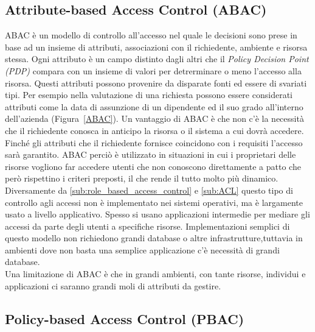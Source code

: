 \subsection{Attribute-based Access Control (ABAC)} %
\label{sub:attribute_based_access_control_}

ABAC è un modello di controllo all'accesso  nel quale le decisioni sono prese in base ad un insieme 
di attributi, associazioni con il richiedente, ambiente e risorsa stessa.
Ogni attributo è un campo distinto dagli altri che il \textit{Policy Decision Point (PDP)} compara con un insieme di valori per detrerminare o meno l'accesso alla risorsa.
Questi attributi possono provenire da disparate fonti ed essere di svariati tipi. Per esempio nella valutazione di una richiesta possono essere considerati attributi come la data di assunzione di un dipendente ed il suo grado all'interno dell'azienda (Figura~\ref{ABAC}). 
Un vantaggio di ABAC è che non c'è la necessità che il richiedente conosca in anticipo
la risorsa o il sistema a cui dovrà accedere. Finché gli attributi che il richiedente fornisce 
coincidono con i requisiti l'accesso sarà garantito. ABAC perciò è utilizzato in situazioni in 
cui i proprietari delle risorse vogliono far accedere utenti che non conoscono direttamente a patto che però rispettino i criteri preposti, il che rende il tutto molto più dinamico.\\
Diversamente da \ref{sub:role_based_access_control} e \ref{sub:ACL} questo tipo di controllo agli 
accessi non è implementato nei sistemi operativi, ma è largamente usato a livello applicativo.
Spesso si usano applicazioni intermedie per mediare gli accessi da parte degli utenti a specifiche risorse.
Implementazioni semplici di questo modello non richiedono grandi database o altre infrastrutture,tuttavia in ambienti dove non basta una semplice applicazione c'è necessità di grandi database.\\
Una limitazione di ABAC è che in grandi ambienti, con tante risorse, individui e applicazioni ci saranno grandi moli di attributi da gestire.


\subsection{Policy-based Access Control (PBAC)} %
\label{sub:policy_based_access_control_}

